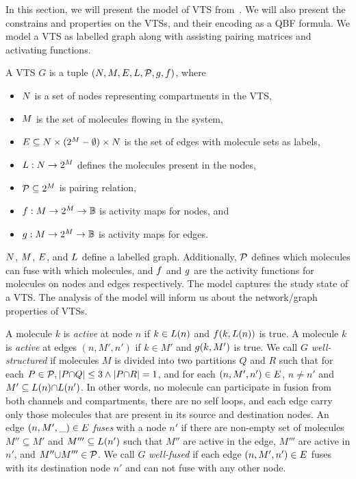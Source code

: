 In this section, we will present the model of VTS from~\cite{PloS,SASB}.
%
We will also present the constrains and properties on the VTSs, and their
encoding as a QBF formula.   
%
We model a VTS as labelled graph along with assisting pairing matrices and
activating functions.

\begin{df}
  A VTS $G$ is a tuple $(N,M,E,L,\mathcal{P},g,f)$, where
  \begin{itemize}
  \item $N$ is a set of nodes representing compartments in the VTS,
  \item $M$ is the set of molecules flowing in the system, 
  \item $E \subseteq N \times (2^{M}-\emptyset) \times N$ is the
    set of edges with molecule sets as labels,
  \item $L : N \rightarrow 2^{M}$ defines the molecules present in the nodes,
  \item $\mathcal{P} \subseteq 2^{M}$ is pairing relation,
  \item $f : M \rightarrow 2^{M} \rightarrow \mathbb{B}$ is activity maps for nodes, and
  \item $g : M \rightarrow 2^{M} \rightarrow \mathbb{B} $ is activity maps for edges.
  \end{itemize}
\end{df}
$N$, $M$, $E$, and $L$ define a labelled graph.
%
Additionally, $\mathcal{P}$ defines which molecules can fuse with which molecules,
and
$f$ and $g$ are the activity functions for molecules on
nodes and edges respectively.
%
The model captures the study state of a VTS.
%
The analysis of the model will inform us about the network/graph
properties of VTSs.

%
A molecule $k$ is {\em active} at node $n$ if $k \in L(n)$ and
$f(k,L(n))$ is true.
%
A molecule $k$ is {\em active} at edges $(n,M',n')$ if $k \in M'$ and
$g(k,M')$ is true.
%
We call $G$ {\em well-structured} if molecules $M$ is divided into
two partitions $Q$ and $R$ such that
for each $P \in \mathcal{P}, |P {\cap} Q| \leq 3 \land |P {\cap} R| = 1 $, and
for each $(n,M',n') \in E$, $n \neq n'$ and
$M' \subseteq L(n) {\cap} L(n')$.
%
In other words,
no molecule can participate in fusion from both channels and
compartments,
%
there are no self loops, and 
each edge carry only those molecules that are present in its source
and destination nodes. 
%
An edge $(n,M',\_) \in E$ {\em fuses} with a node $n'$
if there are non-empty set of molecules $M'' \subseteq M'$ and $M''' \subseteq L(n')$
such that $M''$ are active in the edge, $M'''$ are active in $n'$, and $M'' {\cup} M''' \in \mathcal{P}$.
%
We call $G$ {\em well-fused} if each edge $(n,M',n') \in E$ fuses
with its destination node $n'$
and can not fuse with any other node.

